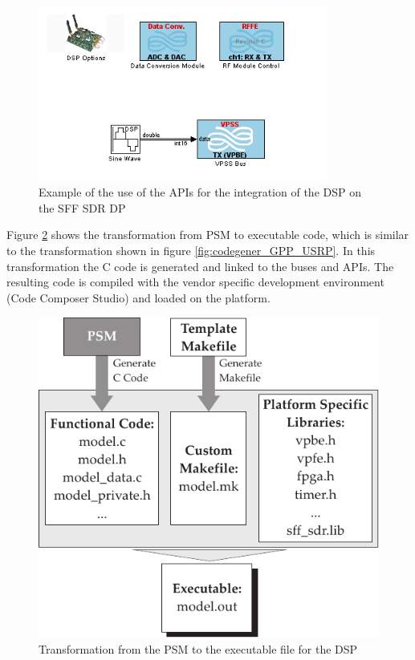 \begin{figure}[htbp]
	\centering
		\includegraphics[width=0.85\textwidth]{../kapitel03/figures/SFF_DSP_API.PNG}
	\caption{Example of the use of the APIs for the integration of the DSP on the \ac{SFF SDR DP}}
	\label{fig:SFF_DSP_API}
\end{figure}

Figure \ref{fig:codegener_DSP_SFF_SDR} shows the transformation from \ac{PSM} to executable code, which is similar to the transformation shown in figure \ref{fig:codegener_GPP_USRP}. In this transformation the C code is generated and linked to the buses and APIs. The resulting code is compiled with the vendor specific development environment (Code Composer Studio) and loaded on the platform.
 
\begin{figure}[htbp]
	\centering
		\includegraphics{../kapitel03/figures/codegener_DSP_SFF_SDR.pdf}
	\caption{Transformation from the \ac{PSM} to the executable file for the DSP}
	\label{fig:codegener_DSP_SFF_SDR}
\end{figure}


